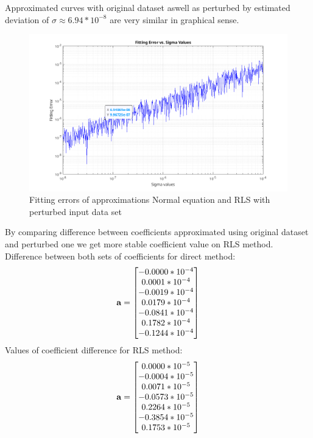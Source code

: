 Approximated curves with original dataset aswell as perturbed by estimated deviation of $\sigma \approx 6.94*10^{-8}$ are very similar in graphical sense.
\begin{figure}[H]
    \centering
    \includegraphics[width=1\textwidth]{images/Problem_11/fittingErrors.png}
    \caption{Fitting errors of approximations Normal equation and RLS with perturbed input data set}
\end{figure}
By comparing difference between coefficients approximated using original dataset and perturbed one we get more stable coefficient value on RLS method.
Difference between both sets of coefficients for direct method:
\begin{equation*}
    \mathbf{a} = \begin{bmatrix}
        -0.0000  * 10^{-4}\\
        0.0001 * 10^{-4}\\
       -0.0019 * 10^{-4}\\
        0.0179 * 10^{-4}\\
       -0.0841 * 10^{-4}\\
        0.1782 * 10^{-4}\\
       -0.1244 * 10^{-4}
    \end{bmatrix}
\end{equation*}
Values of coefficient difference for RLS method:
\begin{equation*}
    \mathbf{a} = \begin{bmatrix}
            0.0000 * 10^{-5}\\
           -0.0004 * 10^{-5}\\
            0.0071 * 10^{-5}\\
           -0.0573 * 10^{-5}\\
            0.2264 * 10^{-5}\\
           -0.3854 * 10^{-5}\\
            0.1753 * 10^{-5}
    \end{bmatrix}
\end{equation*}


